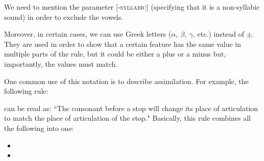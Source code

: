 \begin{refsection}
We need to mention the parameter {[}\textsc{-syllabic}{]} (specifying that it is a non-syllabic sound) in order to exclude the vowels.

Moreover, in certain cases, we can use Greek letters
(\(α,\ \beta,\ \gamma\), etc.) instead of \(\pm\). They are used in
order to show that a certain feature has the same value in multiple parts of the rule, but it could be either a plus or a minus but, importantly, the values must match.

One common use of this notation is to describe assimilation. For example, the following rule: 


\ea
{}
\z

can be read as: ``The consonant  before a stop will change its place of articulation to match the place of articulation of the stop." Basically, this rule combines all the following into one: 

\begin{itemize}
\item {}


\item {}


\end{itemize}
\end{refsection}
